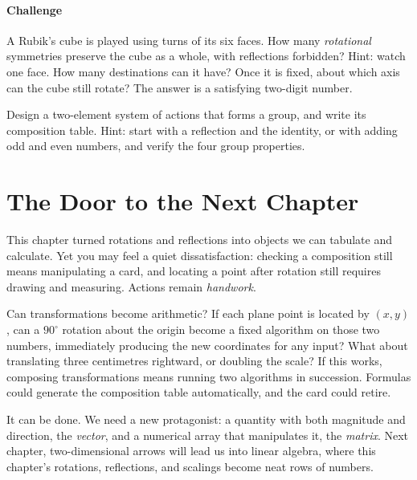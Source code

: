 \paragraph{Challenge}
\begin{sikao}
  \item A Rubik's cube is played using turns of its six faces. How many \emph{rotational} symmetries preserve the cube as a whole, with reflections forbidden? Hint: watch one face. How many destinations can it have? Once it is fixed, about which axis can the cube still rotate? The answer is a satisfying two-digit number.
  \item Design a two-element system of actions that forms a group, and write its composition table. Hint: start with a reflection and the identity, or with adding odd and even numbers, and verify the four group properties.
\end{sikao}

\section*{The Door to the Next Chapter}

This chapter turned rotations and reflections into objects we can tabulate and calculate. Yet you may feel a quiet dissatisfaction: checking a composition still means manipulating a card, and locating a point after rotation still requires drawing and measuring. Actions remain \emph{handwork}.

Can transformations become arithmetic? If each plane point is located by $(x,y)$, can a $90^\circ$ rotation about the origin become a fixed algorithm on those two numbers, immediately producing the new coordinates for any input? What about translating three centimetres rightward, or doubling the scale? If this works, composing transformations means running two algorithms in succession. Formulas could generate the composition table automatically, and the card could retire.

It can be done. We need a new protagonist: a quantity with both magnitude and direction, the \emph{vector}, and a numerical array that manipulates it, the \emph{matrix}. Next chapter, two-dimensional arrows will lead us into linear algebra, where this chapter's rotations, reflections, and scalings become neat rows of numbers.
